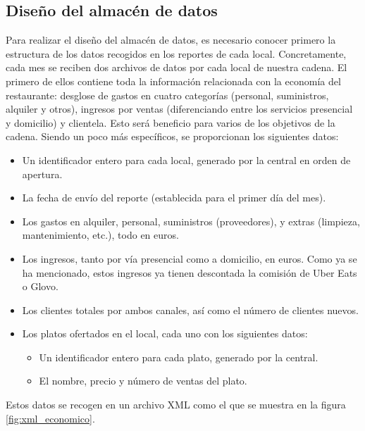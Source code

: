 \documentclass[12pt]{opticajnl}
\begin{document}
\subsection{Diseño del almacén de datos}

Para realizar el diseño del almacén de datos, es necesario conocer primero la estructura de los datos recogidos en los reportes de cada local. Concretamente, cada mes se reciben dos archivos de datos por cada local de nuestra cadena. El primero de ellos contiene toda la información relacionada con la economía del restaurante: desglose de gastos en cuatro categorías (personal, suministros, alquiler y otros), ingresos por ventas (diferenciando entre los servicios presencial y domicilio) y clientela. Esto será beneficio para varios de los objetivos de la cadena. Siendo un poco más específicos, se proporcionan los siguientes datos:
\begin{itemize}
\item Un identificador entero para cada local, generado por la central en orden de apertura.
\item La fecha de envío del reporte (establecida para el primer día del mes). 
\item Los gastos en alquiler, personal, suministros (proveedores), y extras (limpieza, mantenimiento, etc.), todo en euros.
\item Los ingresos, tanto por vía presencial como a domicilio, en euros. Como ya se ha mencionado, estos ingresos ya tienen descontada la comisión de Uber Eats o Glovo.
\item Los clientes totales por ambos canales, así como el número de clientes nuevos.
\item Los platos ofertados en el local, cada uno con los siguientes datos:
\begin{itemize}
\item Un identificador entero para cada plato, generado por la central.
\item El nombre, precio y número de ventas del plato. 
\end{itemize}
\end{itemize}

Estos datos se recogen en un archivo XML como el que se muestra en la figura \ref{fig:xml_economico}.
\end{document}
